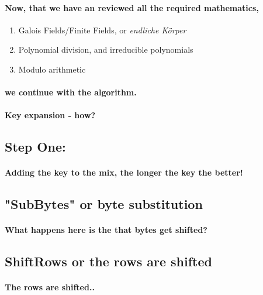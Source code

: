 \paragraph{Now, that we have an reviewed all the required mathematics,}

\begin{enumerate}
\item Galois Fields/Finite Fields, or \emph{endliche Körper}
\item Polynomial division, and irreducible polynomials
\item Modulo arithmetic
\end{enumerate}

\paragraph{we continue with the algorithm.}

\paragraph{Key expansion - how?}

\subsection{Step One:}
\paragraph{Adding the key to the mix, the longer the key the better!}


\subsection{"SubBytes" or byte substitution}
\paragraph{What happens here is the that bytes get shifted?}



\subsection{ShiftRows or the rows are shifted}
\paragraph{The rows are shifted..}


